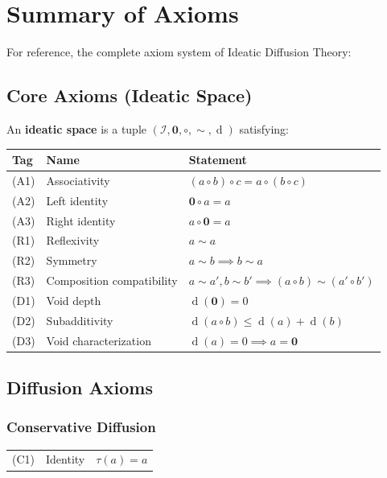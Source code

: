 \documentclass[11pt,openany]{book}
\theoremstyle{definition}
\theoremstyle{plain}
\theoremstyle{remark}
\newcommand{\IS}{\mathcal{I}}               %
\newcommand{\compose}{\circ}                 %
\newcommand{\void}{\mathbf{0}}              %
\newcommand{\res}{\sim}                      %
\newcommand{\depth}{\operatorname{d}}       %
\newcommand{\transmit}{\tau}                 %
\begin{document}
\chapter{Summary of Axioms}
\label{app:axioms}

For reference, the complete axiom system of Ideatic Diffusion Theory:

\section{Core Axioms (Ideatic Space)}

An \textbf{ideatic space} is a tuple $(\IS, \void, \compose, \res, \depth)$ satisfying:

\begin{center}
\begin{tabular}{lll}
\textbf{Tag} & \textbf{Name} & \textbf{Statement} \\
\hline
(A1) & Associativity & $(a \compose b) \compose c = a \compose (b \compose c)$ \\
(A2) & Left identity & $\void \compose a = a$ \\
(A3) & Right identity & $a \compose \void = a$ \\
\hline
(R1) & Reflexivity & $a \res a$ \\
(R2) & Symmetry & $a \res b \implies b \res a$ \\
(R3) & Composition compatibility & $a \res a', b \res b' \implies (a \compose b) \res (a' \compose b')$ \\
\hline
(D1) & Void depth & $\depth(\void) = 0$ \\
(D2) & Subadditivity & $\depth(a \compose b) \leq \depth(a) + \depth(b)$ \\
(D3) & Void characterization & $\depth(a) = 0 \implies a = \void$ \\
\end{tabular}
\end{center}

\section{Diffusion Axioms}

\subsection{Conservative Diffusion}
\begin{center}
\begin{tabular}{lll}
(C1) & Identity & $\transmit(a) = a$ \\
\end{tabular}
\end{center}
\end{document}
